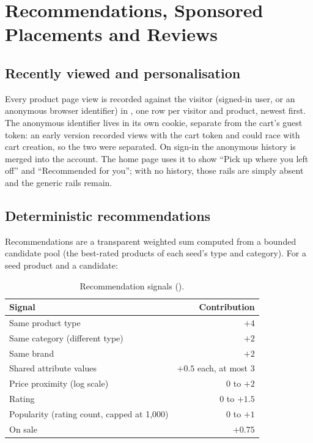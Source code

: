 \chapter{Recommendations, Sponsored Placements and Reviews}
\label{ch:discovery}

\section{Recently viewed and personalisation}

Every product page view is recorded against the visitor (signed-in user, or an anonymous browser identifier) in , one row per visitor and product, newest first. The anonymous identifier lives in its own cookie, separate from the cart's guest token: an early version recorded views with the cart token and could race with cart creation, so the two were separated. On sign-in the anonymous history is merged into the account. The home page uses it to show ``Pick up where you left off'' and ``Recommended for you''; with no history, those rails are simply absent and the generic rails remain. \tagimpl{} \tagtest{}

\section{Deterministic recommendations}

Recommendations are a transparent weighted sum computed from a bounded candidate pool (the best-rated products of each seed's type and category). For a seed product and a candidate:

\begin{table}[H]
\centering
\caption{Recommendation signals ().}
\label{tab:reco}
\small
\begin{tabular}{@{}lr@{}}
\toprule
Signal & Contribution \\
\midrule
Same product type & $+4$ \\
Same category (different type) & $+2$ \\
Same brand & $+2$ \\
Shared attribute values & $+0.5$ each, at most 3 \\
Price proximity (log scale) & $0$ to $+2$ \\
Rating & $0$ to $+1.5$ \\
Popularity (rating count, capped at 1,000) & $0$ to $+1$ \\
On sale & $+0.75$ \\
\bottomrule
\end{tabular}
\end{table}

